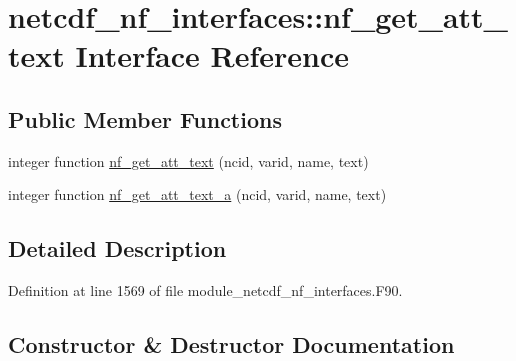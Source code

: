 \hypertarget{interfacenetcdf__nf__interfaces_1_1nf__get__att__text}{}\section{netcdf\+\_\+nf\+\_\+interfaces\+:\+:nf\+\_\+get\+\_\+att\+\_\+text Interface Reference}
\label{interfacenetcdf__nf__interfaces_1_1nf__get__att__text}
\subsection*{Public Member Functions}
\begin{DoxyCompactItemize}
\item 
integer function \hyperlink{interfacenetcdf__nf__interfaces_1_1nf__get__att__text_a3b6eb5a5f22dc7a2167bb02ae818f2c2}{nf\+\_\+get\+\_\+att\+\_\+text} (ncid, varid, name, text)
\item 
integer function \hyperlink{interfacenetcdf__nf__interfaces_1_1nf__get__att__text_ad178cfb089fca708f3fd2847b0de4e9e}{nf\+\_\+get\+\_\+att\+\_\+text\+\_\+a} (ncid, varid, name, text)
\end{DoxyCompactItemize}


\subsection{Detailed Description}


Definition at line 1569 of file module\+\_\+netcdf\+\_\+nf\+\_\+interfaces.\+F90.



\subsection{Constructor \& Destructor Documentation}
\mbox{\label{interfacenetcdf__nf__interfaces_1_1nf__get__att__text_a3b6eb5a5f22dc7a2167bb02ae818f2c2}} 
